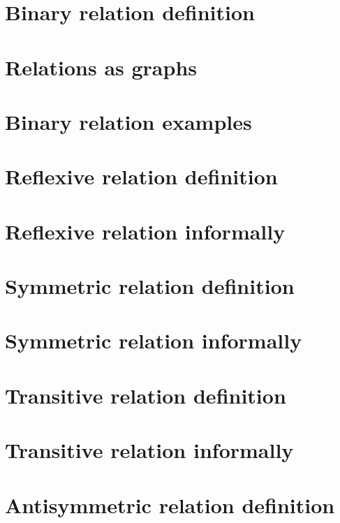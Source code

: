 
\section*{Binary relation definition}

\vfill
\section*{Relations as graphs}

\vfill
\section*{Binary relation examples}

\vfill
\section*{Reflexive relation definition}

\vfill
\section*{Reflexive relation informally}

\vfill
\section*{Symmetric relation definition}

\vfill
\section*{Symmetric relation informally}

\vfill
\section*{Transitive relation definition}

\vfill
\section*{Transitive relation informally}

\vfill
\section*{Antisymmetric relation definition}

\vfill
